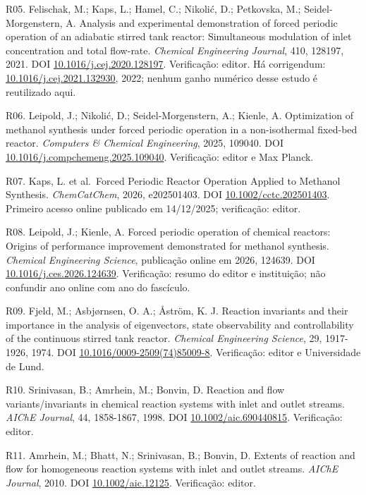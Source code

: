 \documentclass[
  11pt,
  letterpaper,
]{article}
\begin{document}
R05. Felischak, M.; Kaps, L.; Hamel, C.; Nikolić, D.; Petkovska, M.;
Seidel-Morgenstern, A. Analysis and experimental demonstration of forced
periodic operation of an adiabatic stirred tank reactor: Simultaneous
modulation of inlet concentration and total flow-rate. \emph{Chemical
Engineering Journal}, 410, 128197, 2021. DOI
\href{https://doi.org/10.1016/j.cej.2020.128197}{10.1016/j.cej.2020.128197}.
Verificação: editor. Há corrigendum:
\href{https://doi.org/10.1016/j.cej.2021.132930}{10.1016/j.cej.2021.132930},
2022; nenhum ganho numérico desse estudo é reutilizado aqui.

R06. Leipold, J.; Nikolić, D.; Seidel-Morgenstern, A.; Kienle, A.
Optimization of methanol synthesis under forced periodic operation in a
non-isothermal fixed-bed reactor. \emph{Computers \& Chemical
Engineering}, 2025, 109040. DOI
\href{https://doi.org/10.1016/j.compchemeng.2025.109040}{10.1016/j.compchemeng.2025.109040}.
Verificação: editor e Max Planck.

R07. Kaps, L. et al.~Forced Periodic Reactor Operation Applied to
Methanol Synthesis. \emph{ChemCatChem}, 2026, e202501403. DOI
\href{https://doi.org/10.1002/cctc.202501403}{10.1002/cctc.202501403}.
Primeiro acesso online publicado em 14/12/2025; verificação: editor.

R08. Leipold, J.; Kienle, A. Forced periodic operation of chemical
reactors: Origins of performance improvement demonstrated for methanol
synthesis. \emph{Chemical Engineering Science}, publicação online em
2026, 124639. DOI
\href{https://doi.org/10.1016/j.ces.2026.124639}{10.1016/j.ces.2026.124639}.
Verificação: resumo do editor e instituição; não confundir ano online
com ano do fascículo.

R09. Fjeld, M.; Asbjørnsen, O. A.; Åström, K. J. Reaction invariants and
their importance in the analysis of eigenvectors, state observability
and controllability of the continuous stirred tank reactor.
\emph{Chemical Engineering Science}, 29, 1917-1926, 1974. DOI
\href{https://doi.org/10.1016/0009-2509(74)85009-8}{10.1016/0009-2509(74)85009-8}.
Verificação: editor e Universidade de Lund.

R10. Srinivasan, B.; Amrhein, M.; Bonvin, D. Reaction and flow
variants/invariants in chemical reaction systems with inlet and outlet
streams. \emph{AIChE Journal}, 44, 1858-1867, 1998. DOI
\href{https://doi.org/10.1002/aic.690440815}{10.1002/aic.690440815}.
Verificação: editor.

R11. Amrhein, M.; Bhatt, N.; Srinivasan, B.; Bonvin, D. Extents of
reaction and flow for homogeneous reaction systems with inlet and outlet
streams. \emph{AIChE Journal}, 2010. DOI
\href{https://doi.org/10.1002/aic.12125}{10.1002/aic.12125}.
Verificação: editor.
\end{document}
